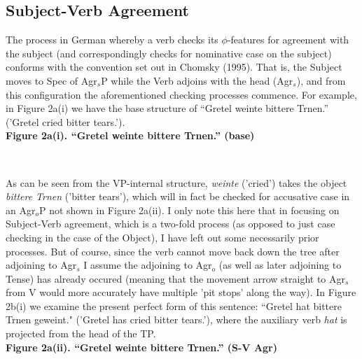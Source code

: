 \documentclass[12pt]{article}
\begin{document}
\begin{flushleft}
\subsection{Subject-Verb Agreement}
The process in German whereby a verb checks its $\phi$-features for agreement with the subject (and correspondingly checks for nominative case on the subject) conforms with the convention set out in Chomsky (1995). That is, the Subject moves to Spec of Agr$_s$P while the Verb adjoins with the head (Agr$_s$), and from this configuration the aforementioned checking processes commence. For example, in Figure 2a(i) we have the base structure of ``Gretel weinte bittere Trnen.'' ('Gretel cried bitter tears.'). \\
\bigskip
{\bf Figure 2a(i). ``Gretel weinte bittere Trnen.'' (base)} \\
\bigskip
{\centering
{} \\
}
As can be seen from the VP-internal structure, {\it weinte} ('cried') takes the object {\it bittere Trnen} ('bitter tears'), which will in fact be checked for accusative case in an Agr$_o$P not shown in Figure 2a(ii). I only note this here that in focusing on Subject-Verb agreement, which is a two-fold process (as opposed to just case checking in the case of the Object), I have left out some necessarily prior processes. But of course, since the verb cannot move back down the tree after adjoining to Agr$_s$ I assume the adjoining to Agr$_o$ (as well as later adjoining to Tense) has already occured (meaning that the movement arrow straight to Agr$_s$ from V would more accurately have multiple 'pit stops' along the way). In Figure 2b(i) we examine the present perfect form of this sentence: ``Gretel hat bittere Trnen geweint." ('Gretel has cried bitter tears.'), where the auxiliary verb {\it hat} is projected from the head of the TP. \\
\bigskip
{\bf Figure 2a(ii). ``Gretel weinte bittere Trnen.'' (S-V Agr)} \\
\bigskip
{\centering
{} \\
}


\end{flushleft}
\end{document}
